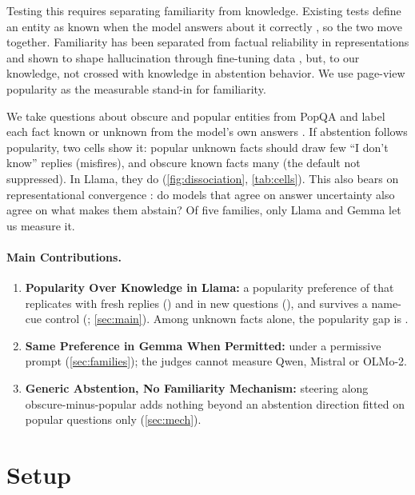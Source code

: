 \documentclass{article}
\newcommand{\idk}{``I don't know''}
\begin{document}
Testing this requires separating familiarity from knowledge. Existing tests define an entity as known when the model answers about it correctly \citep{ferrando2025iknow}, so the two move together. Familiarity has been separated from factual reliability in representations \citep{brzezinka2026bielik} and shown to shape hallucination through fine-tuning data \citep{kang2025unfamiliar}, but, to our knowledge, not crossed with knowledge in abstention behavior. We use page-view popularity as the measurable stand-in for familiarity.

We take questions about obscure and popular entities from PopQA \citep{mallen2023popqa} and label each fact known or unknown from the model's own answers \citep{gekhman2024slick}. If abstention follows popularity, two cells show it: popular unknown facts should draw few \idk{} replies (misfires), and obscure known facts many (the default not suppressed). In Llama, they do (\cref{fig:dissociation}, \cref{tab:cells}). This also bears on representational convergence \citep{huh2024platonic}: do models that agree on answer uncertainty also agree on what makes them abstain? Of five families, only Llama and Gemma let us measure it.

\paragraph{Main Contributions.}
\begin{enumerate}[leftmargin=1.4em,itemsep=1pt,topsep=2pt,parsep=0pt]
\item \textbf{Popularity Over Knowledge in Llama:} a popularity preference of \hmLlamaDiff{} \hmLlamaDiffCI{} that replicates with fresh replies (\frDiff) and in new questions (\nqDiff), and survives a name-cue control (\ncDiff; \cref{sec:main}). Among unknown facts alone, the popularity gap is \rcUnk{} \rcUnkCI.
\item \textbf{Same Preference in Gemma When Permitted:} \pmGemmaDiff{} \pmGemmaDiffCI{} under a permissive prompt (\cref{sec:families}); the judges cannot measure Qwen, Mistral or OLMo-2.
\item \textbf{Generic Abstention, No Familiarity Mechanism:} steering along obscure-minus-popular adds nothing beyond an abstention direction fitted on popular questions only (\cref{sec:mech}).
\end{enumerate}

\section{Setup}
\label{sec:setup}
\end{document}

